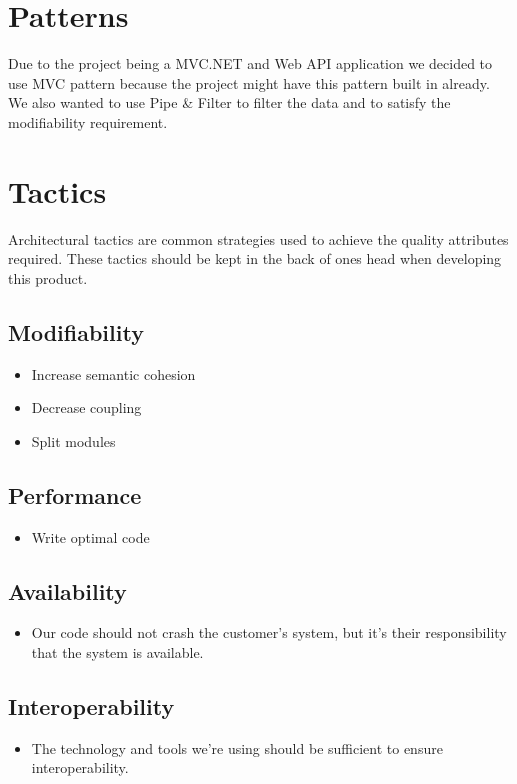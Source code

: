 \section{Patterns}
Due to the project being a MVC.NET and Web API application we decided to use MVC pattern because the project might have this pattern built in already. We also wanted to use Pipe \& Filter to filter the data and to satisfy the modifiability requirement.

\section{Tactics}
Architectural tactics are common strategies used to achieve the quality attributes required. These tactics should be kept in the back of ones head when developing this product.
\subsection{Modifiability}
\begin{itemize}
\item Increase semantic cohesion
\item Decrease coupling
\item Split modules
\end{itemize}

\subsection{Performance}
\begin{itemize}
\item Write optimal code
\end{itemize}

\subsection{Availability}
\begin{itemize}
\item Our code should not crash the customer's system, but it's their responsibility that the system is available.
\end{itemize}

\subsection{Interoperability}
\begin{itemize}
\item The technology and tools we're using should be sufficient to ensure interoperability.
\end{itemize}

